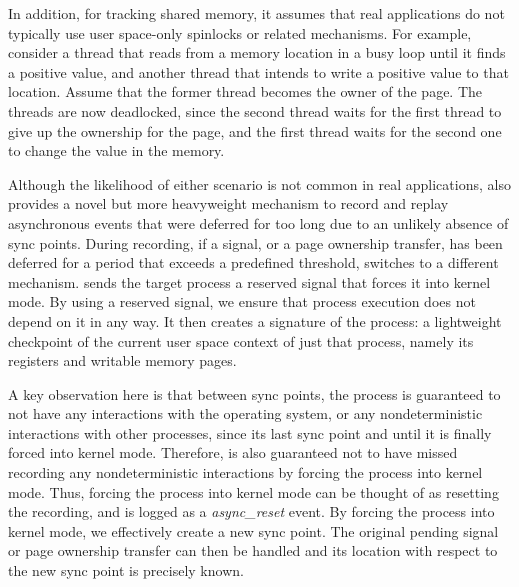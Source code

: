 \begin{table}[]
In addition, for tracking shared memory, it assumes that real
applications do not typically use user space-only spinlocks or related
mechanisms.  For example, consider a thread that reads from a memory
location in a busy loop until it finds a positive value, and another
thread that intends to write a positive value to that location.
Assume that the former thread becomes the owner of the page.  The
threads are now deadlocked, since the second thread waits for the
first thread to give up the ownership for the page, and the first
thread waits for the second one to change the value in the memory.

Although the likelihood of either scenario is not common in real
applications, \scribe{} also provides a novel but more heavyweight
mechanism to record and replay asynchronous events that were
deferred for too long due to an unlikely absence of sync points.
During recording, if a signal, or a page ownership transfer, has been
deferred for a period that exceeds a predefined threshold, \scribe{}
switches to a different mechanism.
\scribe{} sends the target process a reserved signal that forces it
into kernel mode.  By using a reserved signal, we ensure that process
execution does not depend on it in any way. It then creates a
signature of the process: a lightweight checkpoint of the current
user space context of just that process, namely its registers and
writable memory pages.

  

A key observation here is that between sync points, the process is
guaranteed to not have any interactions
with the operating system, or any nondeterministic interactions with
other processes, since its last sync point and until it is finally
forced into kernel mode.  Therefore, \scribe{} is also guaranteed not
to have missed recording any nondeterministic interactions by forcing
the process into kernel mode. Thus, forcing the process into kernel
mode can be thought of as resetting the recording, and is logged as a
{\it async\_reset} event.  By forcing the process into kernel mode, we
effectively create a new sync point.  The original pending signal or
page ownership transfer can then be handled and its location with
respect to the new sync point is precisely known.


\end{table}
